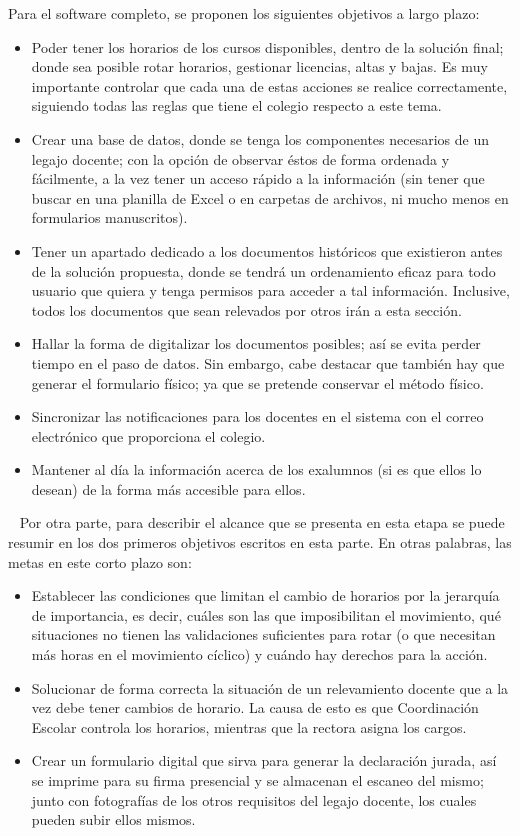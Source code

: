 \normalsize{ \indent
Para el software completo, se proponen los siguientes objetivos
a largo plazo:
}
\begin{itemize}
  \item Poder tener los horarios de los cursos disponibles,
  dentro de la solución final; donde sea posible rotar
  horarios, gestionar licencias, altas y bajas. Es muy
  importante controlar que cada una de estas acciones se
  realice correctamente, siguiendo todas las reglas que tiene
  el colegio respecto a este tema.
  \item Crear una base de datos, donde se tenga los componentes
  necesarios de un legajo docente; con la opción de observar
  éstos de forma ordenada y fácilmente, a la vez tener un acceso
  rápido a la información (sin tener que buscar en una planilla
  de Excel o en carpetas de archivos, ni mucho menos en formularios
  manuscritos).
  \item Tener un apartado dedicado a los documentos históricos que
  existieron antes de la solución propuesta, donde se tendrá un
  ordenamiento eficaz para todo usuario que quiera y tenga permisos
  para acceder a tal información. Inclusive, todos los documentos
  que sean relevados por otros irán a esta sección.
  \item Hallar la forma de digitalizar los documentos posibles;
  así se evita perder tiempo en el paso de datos. Sin embargo,
  cabe destacar que también hay que generar el formulario físico;
  ya que se pretende conservar el método físico.
  \item Sincronizar las notificaciones para los docentes en el
  sistema con el correo electrónico que proporciona el colegio.
  \item Mantener al día la información acerca de los exalumnos
  (si es que ellos lo desean) de la forma más accesible para ellos.
\end{itemize}
\ \newline
\normalsize{ \indent
Por otra parte, para describir el alcance que se presenta en esta
etapa se puede resumir en los dos primeros objetivos escritos en
esta parte. En otras palabras, las metas en este corto plazo son:
}
\begin{itemize}
  \item Establecer las condiciones que limitan el cambio de horarios
  por la jerarquía de importancia, es decir, cuáles son las que
  imposibilitan el movimiento, qué situaciones no tienen las
  validaciones suficientes para rotar (o que necesitan más horas en
  el movimiento cíclico) y cuándo hay derechos para la acción.
  \item Solucionar de forma correcta la situación de un relevamiento
  docente que a la vez debe tener cambios de horario. La causa de
  esto es que Coordinación Escolar controla los horarios, mientras
  que la rectora asigna los cargos.
  \item Crear un formulario digital que sirva para generar la 
  declaración jurada, así se imprime para su firma presencial y se
  almacenan el escaneo del mismo; junto con fotografías de los otros
  requisitos del legajo docente, los cuales pueden subir ellos mismos.
\end{itemize}
